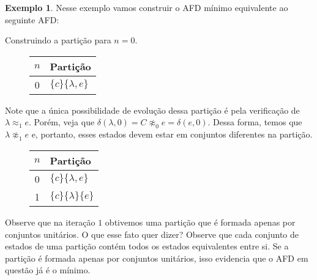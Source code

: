 \documentclass[a4paper]{article}
\theoremstyle{definition}
\newtheorem{Example}{Exemplo}
\begin{document}
  \begin{Example}
    Nesse exemplo vamos construir o AFD mínimo equivalente ao seguinte AFD:
    \begin{figure}[H]
      \centering
    \end{figure}
    Construindo a partição para $n = 0$.
    \begin{figure}[H]
      \begin{tabular}{|c|l|}
        \hline
        $n$ & Partição \\ \hline
        0   & $\{c\}\{\lambda, e\}$ \\\hline
      \end{tabular}
      \centering
    \end{figure}
    Note que a única possibilidade de evolução dessa partição é pela verificação
    de $\lambda \approx_1 e$. Porém, veja que $\delta(\lambda,0) = C
    \not\approx_0 e = \delta(e,0)$. Dessa forma, temos que $\lambda
    \not\approx_1 e$ e, portanto, esses estados devem estar em conjuntos
    diferentes na partição.
    \begin{figure}[H]
      \begin{tabular}{|c|l|}
        \hline
        $n$ & Partição \\ \hline
        0   & $\{c\}\{\lambda, e\}$ \\\hline
        1   & $\{c\}\{\lambda\}\{e\}$ \\ \hline
      \end{tabular}
      \centering
    \end{figure}
    Observe que na iteração $1$ obtivemos uma partição que é formada
    apenas por conjuntos unitários. O que esse fato quer dizer? Observe que
    cada conjunto de estados de uma partição contém todos os estados
    equivalentes entre si. Se a partição é formada apenas por conjuntos
    unitários, isso evidencia que o AFD em questão já é o mínimo.
  \end{Example}
\end{document}
